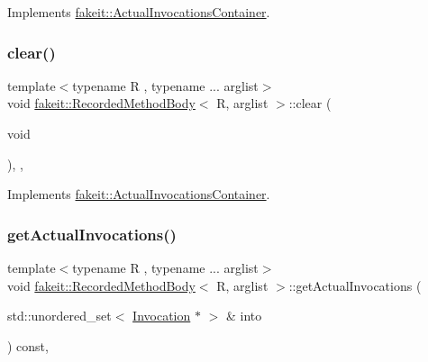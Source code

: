 Implements \mbox{\hyperlink{structfakeit_1_1ActualInvocationsContainer_ab0af1e59028b53f8258b713f89bfdcbe}{fakeit\+::\+Actual\+Invocations\+Container}}.

\mbox{\label{classfakeit_1_1RecordedMethodBody_a6164a16c7813da2b7cd0d46568f1f1bc}} 
\subsubsection{\texorpdfstring{clear()}{clear()}\hspace{0.1cm}{\footnotesize\ttfamily [9/9]}}
{\footnotesize\ttfamily template$<$typename R , typename ... arglist$>$ \\
void \mbox{\hyperlink{classfakeit_1_1RecordedMethodBody}{fakeit\+::\+Recorded\+Method\+Body}}$<$ R, arglist $>$\+::clear (\begin{DoxyParamCaption}\item[{void}]{ }\end{DoxyParamCaption})\hspace{0.3cm}{\ttfamily [inline]}, {\ttfamily [override]}, {\ttfamily [virtual]}}



Implements \mbox{\hyperlink{structfakeit_1_1ActualInvocationsContainer_ab0af1e59028b53f8258b713f89bfdcbe}{fakeit\+::\+Actual\+Invocations\+Container}}.

\mbox{\label{classfakeit_1_1RecordedMethodBody_a72f16057f5f4b556f31237986116a094}} 
\subsubsection{\texorpdfstring{getActualInvocations()}{getActualInvocations()}\hspace{0.1cm}{\footnotesize\ttfamily [1/9]}}
{\footnotesize\ttfamily template$<$typename R , typename ... arglist$>$ \\
void \mbox{\hyperlink{classfakeit_1_1RecordedMethodBody}{fakeit\+::\+Recorded\+Method\+Body}}$<$ R, arglist $>$\+::get\+Actual\+Invocations (\begin{DoxyParamCaption}\item[{std\+::unordered\+\_\+set$<$ \mbox{\hyperlink{structfakeit_1_1Invocation}{Invocation}} $\ast$ $>$ \&}]{into }\end{DoxyParamCaption}) const\hspace{0.3cm}{\ttfamily [inline]}, {\ttfamily [override]}}


